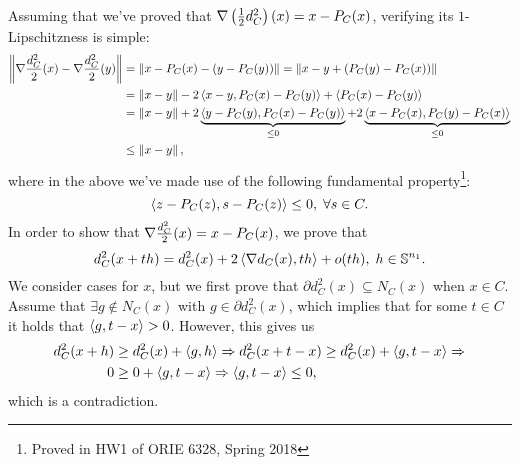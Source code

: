 \documentclass[10pt]{article}
\begin{document}
Assuming that we've proved that $\nabla \left(\frac{1}{2} d_C^2\right)(x) =
x - P_C(x)$, verifying its $1$-Lipschitzness is simple:
\begin{align*}
    \left \| \nabla \frac{d_C^2}{2}(x) - \nabla \frac{d_C^2}{2}(y) \right \| &=
    \left \| x - P_C(x) - (y - P_C(y)) \right \| = \left \| x - y + (P_C(y) - P_C(x)) \right \| \\
    &= \left \| x - y \right \| - 2\left\langle x - y, P_C(x) - P_C(y) \right\rangle + \left\langle P_C(x) - P_C(y) \right\rangle \\
    &= \left \| x - y \right \| + 2 \underbrace{\left\langle y - P_C(y), P_C(x) - P_C(y) \right\rangle}_{\leq 0}
       + 2 \underbrace{\left\langle x - P_C(x), P_C(y) - P_C(x) \right\rangle}_{\leq 0} \\
    &\leq \left \| x - y \right \|,
\end{align*}
where in the above we've made use of the following fundamental
property\footnote{Proved in HW1 of ORIE 6328, Spring 2018}:
\[
    \left\langle z - P_C(z), s - P_C(z) \right\rangle \leq 0, \; \forall s \in C.
\]
In order to show that $\nabla \frac{d_C^2}{2}(x) = x - P_C(x)$, we prove that
\[
    d_C^2(x + th) = d_C^2(x) + 2 \left\langle \nabla d_C(x), th \right\rangle + o(th), \;
    h \in \mathbb{S}^{n_1}.
\]
We consider cases for $x$, but we first prove that $\partial d_C^2(x)
\subseteq N_C(x)$ when $x \in C$. Assume that $\exists g \notin N_C(x)$ with $g
\in \partial d_C^2(x)$, which implies that for some $t \in C$ it holds that
$\left\langle g, t - x \right\rangle > 0$. However, this gives us
\begin{align*}
    d_C^2(x + h) &\geq d_C^2(x) + \left\langle g, h \right\rangle \Rightarrow
    d_C^2(x + t - x) \geq d_C^2(x) + \left\langle g, t - x \right\rangle \Rightarrow \\
    0 &\geq 0 + \left\langle g, t - x \right\rangle \Rightarrow \left\langle g, t - x \right\rangle \leq 0,
\end{align*}
which is a contradiction.
\end{document}
